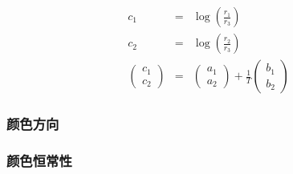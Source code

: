 \documentclass{beamer}
\begin{document}
{{\begin{frame}
  \begin{eqnarray*}
    c_1 & = & \log \left( \frac{r_1}{r_3} \right)\\
    c_2 & = & \log \left( \frac{r_2}{r_3} \right)\\
    \left(\begin{array}{c}
      c_1\\
      c_2
    \end{array}\right) & = & \left(\begin{array}{c}
      a_1\\
      a_2
    \end{array}\right) + \frac{1}{T} \left(\begin{array}{c}
      b_1\\
      b_2
    \end{array}\right)
  \end{eqnarray*}
\end{frame}}{\begin{frame}
  \frametitle{颜色方向}
  
  \quad{}
\end{frame}}{\frametitle{颜色恒常性}

}}
\end{document}
